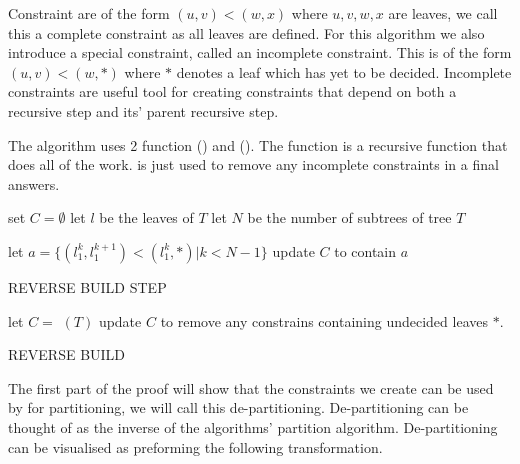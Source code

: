 Constraint are of the form $(u,v)<(w,x)$ where $u,v,w,x$ are leaves, we call this a complete constraint as all leaves are defined.
For this algorithm we also introduce a special constraint, called an incomplete constraint.
This is of the form $(u, v)<(w, *)$ where $*$ denotes a leaf which has yet to be decided.
Incomplete constraints are useful tool for creating constraints that depend on both a recursive step and its' parent recursive step.  


The  algorithm uses 2 function  () and  (). The  function is a recursive function that does all of the work.  is just used to remove any incomplete constraints in a final answers.

\begin{algorithm}[H]
    \LinesNumbered
    \SetAlgoLined
     set $C=\emptyset$\;
     let $l$ be the leaves of $T$ \;
     let $N$ be the number of subtrees of tree $T$\;
     
     let $a = \{(l_1^k, l_1^{k+1}) < (l_1^k, *)|k<N-1\}$\label{alg:make}\;
     update $C$ to contain $a$\;
    
     \caption{REVERSE BUILD STEP}
\end{algorithm}

\begin{algorithm}[H]
    \SetAlgoLined
     
    let $C=$ $(T)$\;
    update $C$ to remove any constrains containing undecided leaves $*$.
     
     \caption{REVERSE BUILD}
\end{algorithm}



 The first part of the proof will show that the constraints we create can be used by  for partitioning, we will call this de-partitioning.
 De-partitioning can be thought of as the inverse of the  algorithms' partition algorithm. De-partitioning can be visualised as preforming the following transformation.\\
 
